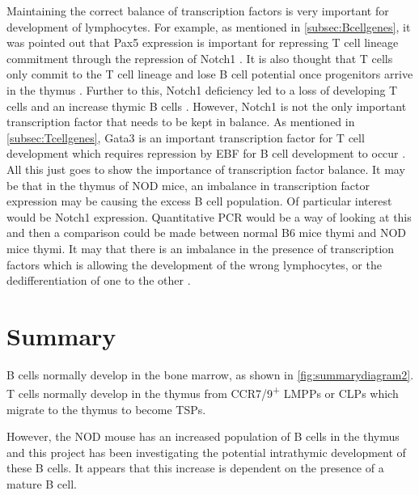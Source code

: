 Maintaining the correct balance of transcription factors is very important for development of lymphocytes. 
For example, as mentioned in \cref{subsec:Bcellgenes}, it was pointed out that Pax5 expression is important for repressing T cell lineage commitment through the repression of Notch1 \citep{Souabni2002}.
It is also thought that T cells only commit to the T cell lineage and lose B cell potential once progenitors arrive in the thymus \citep{Heinzel2007}.
Further to this, Notch1 deficiency led to a loss of developing T cells and an increase thymic B cells \citep{Feyerabend2009}.
However, Notch1 is not the only important transcription factor that needs to be kept in balance.
As mentioned in \cref{subsec:Tcellgenes}, Gata3 is an important transcription factor for T cell development which requires repression by EBF for B cell development to occur \citep{Banerjee2013}.
All this just goes to show the importance of transcription factor balance.
It may be that in the thymus of NOD mice, an imbalance in transcription factor expression may be causing the excess B cell population.
Of particular interest would be Notch1 expression.
Quantitative PCR would be a way of looking at this and then a comparison could be made between normal B6 mice thymi and NOD mice thymi.
It may that there is an imbalance in the presence of transcription factors which is allowing the development of the wrong lymphocytes, or the dedifferentiation of one to the other \citep{Cobaleda2007}.




\section{Summary}

B cells normally develop in the bone marrow, as shown in \cref{fig:summarydiagram2}.
T cells normally develop in the thymus from CCR7/9\textsuperscript{+} LMPPs or CLPs which migrate to the thymus to become TSPs.

However, the NOD mouse has an increased population of B cells in the thymus and this project has been investigating the potential intrathymic development of these B cells.
It appears that this increase is dependent on the presence of a mature B cell.

